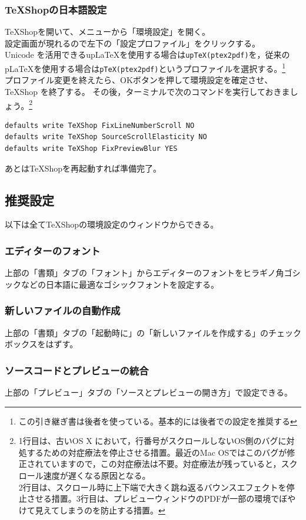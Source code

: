 \documentclass[dvipdfmx,jb5]{jreport}
\begin{document}
\subsubsection{TeXShopの日本語設定}
TeXShopを開いて、メニューから「環境設定」を開く。\\
設定画面が現れるので左下の「設定プロファイル」をクリックする。\\
Unicode を活用できるup\LaTeX を使用する場合は\texttt{upTeX(ptex2pdf)}を，従来の p\LaTeX を使用する場合は\texttt{pTeX(ptex2pdf)}というプロファイルを選択する。\footnote{この引き継ぎ書は後者を使っている。基本的には後者での設定を推奨する}\\
プロファイル変更を終えたら、OKボタンを押して環境設定を確定させ、TeXShop を終了する。
その後，ターミナルで次のコマンドを実行しておきましょう。\footnote{1行目は、古いOS X において，行番号がスクロールしないOS側のバグに対処するための対症療法を停止させる措置。最近のMac OSではこのバグが修正されていますので，この対症療法は不要。対症療法が残っていると，スクロール速度が遅くなる原因となる。\\2行目は、スクロール時に上下端で大きく跳ね返るバウンスエフェクトを停止させる措置。3行目は、プレビューウィンドウのPDFが一部の環境でぼやけて見えてしまうのを防止する措置。}
\begin{lstlisting}
defaults write TeXShop FixLineNumberScroll NO
defaults write TeXShop SourceScrollElasticity NO
defaults write TeXShop FixPreviewBlur YES
  \end{lstlisting}
あとはTeXShopを再起動すれば準備完了。
\subsection{推奨設定}
以下は全てTeXShopの環境設定のウィンドウからできる。
\subsubsection{エディターのフォント}
上部の「書類」タブの「フォント」からエディターのフォントをヒラギノ角ゴシックなどの日本語に最適なゴシックフォントを設定する。
\subsubsection{新しいファイルの自動作成}
上部の「書類」タブの「起動時に」の「新しいファイルを作成する」のチェックボックスをはずす。
\subsubsection{ソースコードとプレビューの統合}
上部の「プレビュー」タブの「ソースとプレビューの開き方」で設定できる。
\end{document}
